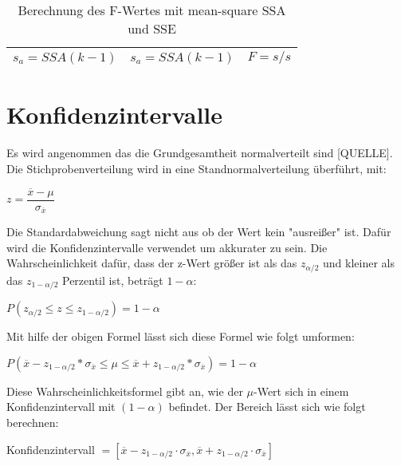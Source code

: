 \begin{center}
  \begin{table}[h!]
    \begin{tabularx}{\textwidth}{|X|X|X|}
      \hline
       $s_a = SSA ( k -1)$ & $s_a = SSA ( k -1)$ & $F = s/s$\\ 
      \hline
    \end{tabularx}
    \caption{Berechnung des F-Wertes mit mean-square SSA und SSE}
    \label{tab:f_computing}
  \end{table}
\end{center}

\section{Konfidenzintervalle}
Es wird angenommen das die Grundgesamtheit normalverteilt sind [QUELLE].
Die Stichprobenverteilung wird in eine Standnormalverteilung überführt, mit:

\begin{center}
  $z = \dfrac{\overline{x} - \mu}{\sigma_{\overline{x}}}$
\end{center}

Die Standardabweichung sagt nicht aus ob der Wert kein "ausreißer" ist. Dafür wird die Konfidenzintervalle verwendet
um akkurater zu sein.
Die Wahrscheinlichkeit dafür, dass der z-Wert
größer ist als das $z_{\alpha/2}$ und kleiner
als das $z_{1-\alpha/2}$ Perzentil ist, beträgt $1 - \alpha$:

\begin{center}
  $P(z_{\alpha/2} \leq z \leq z_{1-\alpha/2}) = 1 - \alpha$
\end{center}

Mit hilfe der obigen Formel lässt sich diese Formel wie folgt umformen:

\begin{center}
  $P(\overline{x} - z_{1-\alpha/2} * \sigma_{\overline{x}} \leq \mu \leq \overline{x} + z_{1-\alpha/2} * \sigma_{\overline{x}}) = 1 - \alpha$
\end{center}

Diese Wahrscheinlichkeitsformel gibt an, wie der $\mu$-Wert sich in einem Konfidenzintervall mit $(1 - \alpha)$ befindet.
Der Bereich lässt sich wie folgt berechnen:

\begin{center}
  Konfidenzintervall $= [\overline{x} - z_{1-\alpha / 2} \cdot \sigma_{\overline{x}}, \overline{x} + z_{1-\alpha / 2} \cdot \sigma_{\overline{x}}]$
\end{center}

